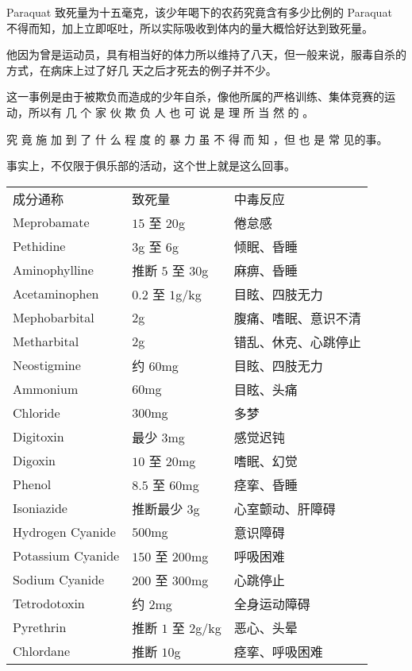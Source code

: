 \documentclass[UTF8]{ctexart}
\begin{document}
Paraquat 致死量为十五毫克，该少年喝下的农药究竟含有多少比例的 Paraquat
不得而知，加上立即呕吐，所以实际吸收到体内的量大概恰好达到致死量。

他因为曾是运动员，具有相当好的体力所以维持了八天，但一般来说，服毒自杀的方式，在病床上过了好几
天之后才死去的例子并不少。

这一事例是由于被欺负而造成的少年自杀，像他所属的严格训练、集体竞赛的运动，所以有 几 个 家 伙 欺 负 人 也 可 说 是 理 所 当 然 的 。

究 竟 施 加 到 了 什 么 程 度 的 暴 力 虽 不 得 而 知 ，但 也 是 常 见的事。

事实上，不仅限于俱乐部的活动，这个世上就是这么回事。

\begin{table}[]
\small
\begin{tabular}{lll}
成分通称              & 致死量                    & 中毒反应       \\
Meprobamate       & $15$ 至 $20$g & 倦怠感        \\
Pethidine         & $3$g 至 $6$g                 & 倾眠、昏睡      \\
Aminophylline     & 推断 $5$ 至 $30$g           & 麻痹、昏睡      \\
Acetaminophen     & $0.2$ 至 $1$g/kg          & 目眩、四肢无力    \\
Mephobarbital     & 2g                     & 腹痛、嗜眠、意识不清 \\
Metharbital       & 2g                     & 错乱、休克、心跳停止 \\
Neostigmine       & 约 $60$mg               & 目眩、四肢无力    \\
Ammonium          & $60$mg                 & 目眩、头痛      \\
Chloride          & $300$mg                & 多梦         \\
Digitoxin         & 最少 $3$mg               & 感觉迟钝       \\
Digoxin           & $10$ 至 $20$mg            & 嗜眠、幻觉      \\
Phenol            & $8.5$ 至 $60$mg           & 痉挛、昏睡      \\
Isoniazide        & 推断最少 $3$g              & 心室颤动、肝障碍   \\
Hydrogen Cyanide  & $500$mg                & 意识障碍       \\
Potassium Cyanide & $150$ 至 $200$mg          & 呼吸困难       \\
Sodium Cyanide    & $200$ 至 $300$mg          & 心跳停止       \\
Tetrodotoxin      & 约 $2$mg                & 全身运动障碍     \\
Pyrethrin         & 推断 $1$ 至 $2$g/kg         & 恶心、头晕      \\
Chlordane         & 推断 $10$g               & 痉挛、呼吸困难   
\end{tabular}
\end{table}
\end{document}
